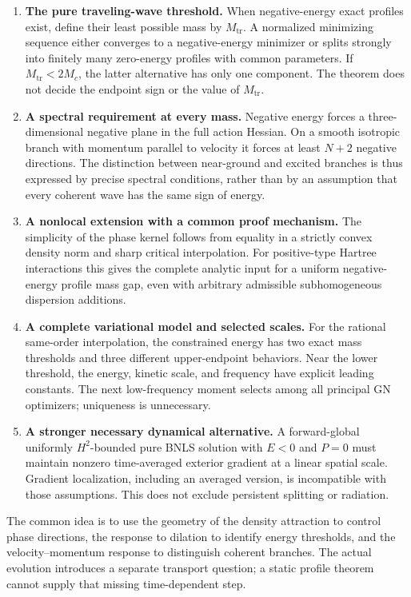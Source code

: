 \documentclass[11pt,a4paper]{article}
\theoremstyle{remark}\newtheorem{remark}[theorem]{Remark}
\begin{document}
\begin{enumerate}
\item \textbf{The pure traveling-wave threshold.}
When negative-energy exact profiles exist, define their least possible
mass by $M_{\mathrm{tr}}$. A normalized minimizing sequence either
converges to a negative-energy minimizer or splits strongly into finitely
many zero-energy profiles with common parameters. If
$M_{\mathrm{tr}}<2M_c$, the latter alternative has only one component.
The theorem does not decide the endpoint sign or the value of
$M_{\mathrm{tr}}$.
\item \textbf{A spectral requirement at every mass.}
Negative energy forces a three-dimensional negative plane in the full
action Hessian. On a smooth isotropic branch with momentum parallel to
velocity it forces at least $N+2$ negative directions. The distinction
between near-ground and excited branches is thus expressed by precise
spectral conditions, rather than by an assumption that every coherent
wave has the same sign of energy.
\item \textbf{A nonlocal extension with a common proof mechanism.}
The simplicity of the phase kernel follows from equality in a strictly
convex density norm and sharp critical interpolation. For positive-type
Hartree interactions this gives the complete analytic input for a
uniform negative-energy profile mass gap, even with arbitrary admissible
subhomogeneous dispersion additions.
\item \textbf{A complete variational model and selected scales.}
For the rational same-order interpolation, the constrained energy has
two exact mass thresholds and three different upper-endpoint behaviors.
Near the lower threshold, the energy, kinetic scale, and frequency have
explicit leading constants. The next low-frequency moment selects among
all principal GN optimizers; uniqueness is unnecessary.
\item \textbf{A stronger necessary dynamical alternative.}
A forward-global uniformly $H^2$-bounded pure BNLS solution with
$E<0$ and $P=0$ must maintain nonzero time-averaged exterior gradient
at a linear spatial scale. Gradient localization, including an averaged
version, is incompatible with those assumptions. This does not exclude
persistent splitting or radiation.
\end{enumerate}

The common idea is to use the geometry of the density attraction to
control phase directions, the response to dilation to identify energy
thresholds, and the velocity--momentum response to distinguish coherent
branches. The actual evolution introduces a separate transport question;
a static profile theorem cannot supply that missing time-dependent step.
\end{document}
